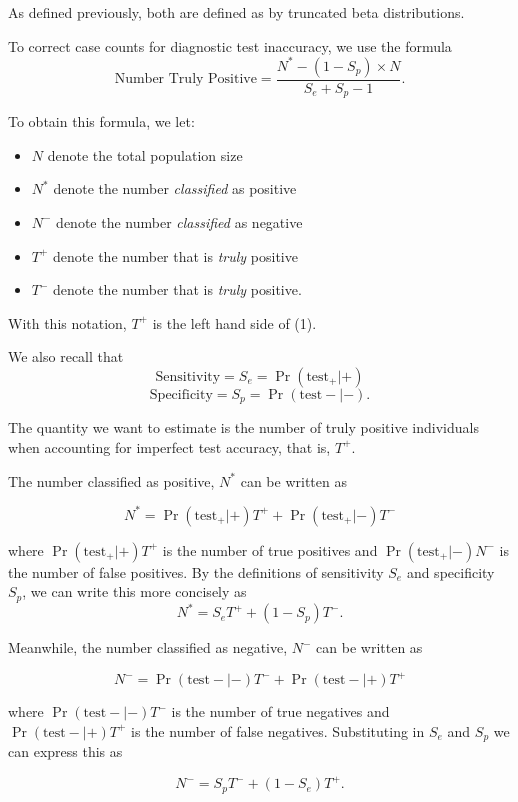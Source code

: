 \documentclass[12pt,twoside]{smiththesis}
\providecommand{\tightlist}{%
  \setlength{\itemsep}{0pt}\setlength{\parskip}{0pt}}
\begin{document}
As defined previously, both are defined as by truncated beta distributions.

To correct case counts for diagnostic test inaccuracy, we use the formula
\[\text{Number Truly Positive} = \dfrac{N^*- (1-S_p) \times N}{S_e+S_p-1}. \tag{1}\]

\vspace{5 mm}

To obtain this formula, we let:
\begin{itemize}
\tightlist
\item
  \(N\) denote the total population size
\item
  \(N^*\) denote the number \emph{classified} as positive
\item
  \(N^-\) denote the number \emph{classified} as negative
\item
  \(T^+\) denote the number that is \emph{truly} positive
\item
  \(T^-\) denote the number that is \emph{truly} positive.
\end{itemize}
With this notation, \(T^+\) is the left hand side of (1).

We also recall that
\[ \text{Sensitivity} = S_e = \Pr(\text{test}_+ | +) \]
\[ \text{Specificity} = S_p = \Pr(\text{test}- | - ) .\]

\noindent The quantity we want to estimate is the number of truly positive individuals when accounting for imperfect test accuracy, that is, \(T^+\).

\noindent The number classified as positive, \(N^*\) can be written as

\[ N^* = \Pr(\text{test}_+ | +) T^+ + \Pr(\text{test}_+  | -) T^-\]

\noindent where \(\Pr(\text{test}_+ | +) T^+\) is the number of true positives and \(\Pr(\text{test}_+ | -) N^-\) is the number of false positives. By the definitions of sensitivity \(S_e\) and specificity \(S_p\), we can write this more concisely as
\[ N^* =S_e T^+ + (1-S_p) T^-.\]

\noindent Meanwhile, the number classified as negative, \(N^-\) can be written as

\[ N^- = \Pr(\text{test} - | -) T^- + \Pr(\text{test} - | +) T^+\]

\noindent where \(\Pr(\text{test} - | -) T^-\) is the number of true negatives and \(\Pr(\text{test}- | +) T^+\) is the number of false negatives. Substituting in \(S_e\) and \(S_p\) we can express this as

\[ N^- = S_p T^- + (1-S_e) T^+.\]
\end{document}
